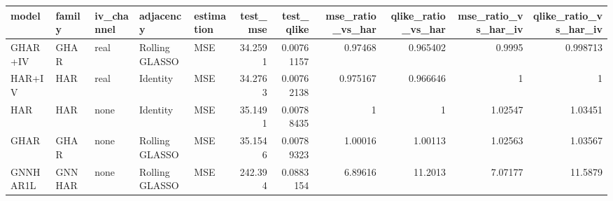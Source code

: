 \begin{tabular}{lllllrrrrrr}
\toprule
model & family & iv_channel & adjacency & estimation & test_mse & test_qlike & mse_ratio_vs_har & qlike_ratio_vs_har & mse_ratio_vs_har_iv & qlike_ratio_vs_har_iv \\
\midrule
GHAR+IV & GHAR & real & Rolling GLASSO & MSE & 34.2591 & 0.00761157 & 0.97468 & 0.965402 & 0.9995 & 0.998713 \\
HAR+IV & HAR & real & Identity & MSE & 34.2763 & 0.00762138 & 0.975167 & 0.966646 & 1 & 1 \\
HAR & HAR & none & Identity & MSE & 35.1491 & 0.00788435 & 1 & 1 & 1.02547 & 1.03451 \\
GHAR & GHAR & none & Rolling GLASSO & MSE & 35.1546 & 0.00789323 & 1.00016 & 1.00113 & 1.02563 & 1.03567 \\
GNNHAR1L & GNNHAR & none & Rolling GLASSO & MSE & 242.394 & 0.0883154 & 6.89616 & 11.2013 & 7.07177 & 11.5879 \\
\bottomrule
\end{tabular}
